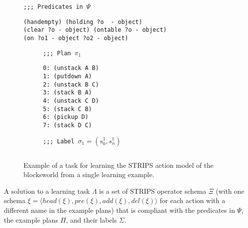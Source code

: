 \documentclass[letterpaper]{article} %
\newcommand{\tup}[1]{{\langle #1 \rangle}}
\begin{document}
\begin{figure}[hbt]
\begin{small}
{\tt ;;; Predicates in $\Psi$}
\begin{verbatim}
(handempty) (holding ?o  - object)
(clear ?o - object) (ontable ?o - object) 
(on ?o1 - object ?o2 - object)  
\end{verbatim}
\end{small}

\vspace{0.5cm}

\begin{subfigure}{.25\textwidth}
\begin{small}
{\tt ;;; Plan $\pi_1$}
\begin{verbatim}
0: (unstack A B)
1: (putdown A)
2: (unstack B C)
3: (stack B A)
4: (unstack C D)
5: (stack C B)
6: (pickup D)
7: (stack D C)
\end{verbatim}
\end{small}
\end{subfigure}%
\begin{subfigure}{.6\textwidth}
{\small\tt ;;; Label $\sigma_1=(s_0^1,s_{n}^1)$}
\begin{lstlisting}[mathescape]
\end{lstlisting}
\vspace{0.1cm}
\vspace{0.6cm}
\end{subfigure}%

 \caption{\small Example of a task for learning the STRIPS action model of the blocksworld from a single learning example.}
\label{fig:lexample}
\end{figure}

A solution to a learning task $\Lambda$ is a set of STRIPS operator schema $\Xi$ (with one schema $\xi=\tup{head(\xi),pre(\xi),add(\xi),del(\xi)}$ for each action with a different name in the example plans) that is compliant with the predicates in $\Psi$, the example plans $\Pi$, and their labels $\Sigma$. 
\end{document}
